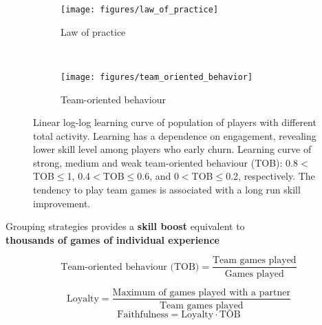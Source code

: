 \documentclass[a0,portrait]{a0poster}
\begin{document}
\begin{multicols}{2}
\begin{figure}[H]
    \vspace{0.5cm}
    \centering
    \begin{subfigure}[t]{0.23\textwidth}
    \texttt{[image: figures/law\_of\_practice]}
    \caption{Law of practice}
    \label{learningskill_curve}
    \end{subfigure}
    \ \
    \begin{subfigure}[t]{0.23\textwidth}
    \texttt{[image: figures/team\_oriented\_behavior]}
    \caption{Team-oriented behaviour}
    \label{learningskill_team_hasta4team}
  \end{subfigure}
    \caption{ Linear log-log learning curve of population of players with different total activity. Learning has a dependence on engagement, revealing lower skill level among players who early churn. Learning curve of strong, medium and weak team-oriented behaviour (TOB): 0.8$<$TOB$\leq$1, 0.4$<$TOB$\leq$0.6, and 0$<$TOB$\leq$0.2, respectively. The tendency to play team games is associated with a long run skill improvement.}
    \label{learning_curve}
\end{figure}

\vspace{0.5cm}
\begin{mdframed}[backgroundcolor=gray!15] 
\Large \centering
\vspace{0.5cm}
Grouping strategies provides a \textbf{skill boost} equivalent to \\ \textbf{thousands of games of individual experience}
\vspace{0.5cm}
\end{mdframed}


\begin{equation}
\text{Team-oriented behaviour (TOB)} = \frac{\text{Team games played}}{\text{Games played}}
\end{equation}

\vspace{0.3cm}

\begin{equation}
\text{Loyalty} = \frac{\text{Maximum of games played with a partner}}{\text{Team games played}}
\end{equation}
\vspace{0.3cm}
\begin{equation}
\text{Faithfulness} = \text{Loyalty} \cdot \text{TOB} 
\end{equation}


\end{multicols}
\end{document}
